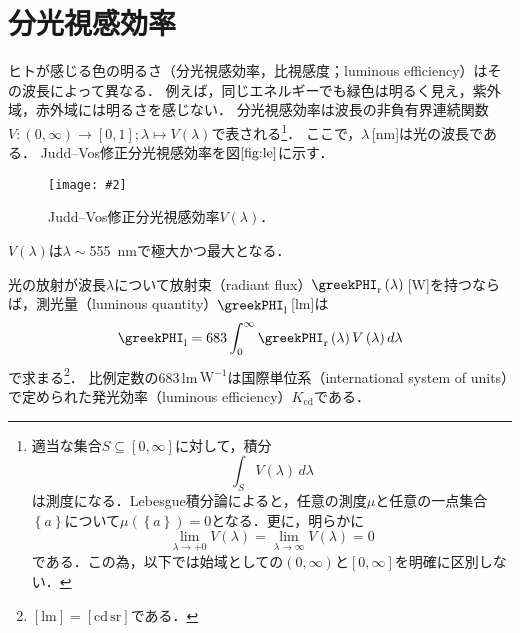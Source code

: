 \documentclass[uplatex,paper=a4,fontsize=4.0truemm,jafontsize=4.0truemm,head_space=30.0truemm,foot_space=30.0truemm,baselineskip=8.0truemm,line_length=40zw,gutter=25.0truemm,oneside,openany,fleqn,hanging_panctuation,open_bracket_pos=nibu_tentsuki,dvipdfmx,jis2004,book,titlepage]{jlreq}
\theoremstyle{mystyle}
\newcommand{\captiondot}[1]{\caption{#1．}}
\newcommand{\figureinput}[4]{\begin{figure}[tbp]\centering\texttt{[image: \#2]}\captiondot{#3}\label{fig:#4}\end{figure}}
\newcommand{\mathdisplaystyle}[1]{\(\displaystyle{#1}\)}
\newcommand{\Reference}[1]{\mathdisplaystyle{\ref{#1}}}
\newcommand{\negativevalue}[1]{{-#1}}
\newcommand{\positivevalue}[1]{{+#1}}
\newcommand{\parentheses}[1]{\left(#1\right)}
\newcommand{\braces}[1]{\left\{#1\right\}}
\newcommand{\squarebrackets}[1]{\left[#1\right]}
\begin{document}
		\section{分光視感効率}
			ヒトが感じる色の明るさ（分光視感効率，比視感度；luminous efficiency）はその波長によって異なる．
			例えば，同じエネルギーでも緑色は明るく見え，紫外域，赤外域には明るさを感じない．
			分光視感効率は波長の非負有界連続関数\mathdisplaystyle{V\colon\parentheses{0,\infty}\to\squarebrackets{0,1};\lambda\mapsto V\parentheses{\lambda}}で表される\footnote{適当な集合\mathdisplaystyle{S\subseteq\squarebrackets{0,\infty}}に対して，積分%
				\begin{equation*}
					\int_S{V\parentheses{\lambda}}\,d\lambda
				\end{equation*}
				は測度になる．Lebesgue積分論によると，任意の測度\mathdisplaystyle{\mu}と任意の一点集合\mathdisplaystyle{\braces{a}}について\mathdisplaystyle{\mu\parentheses{\braces{a}}=0}となる．更に，明らかに%
				\begin{equation*}
					\lim_{\lambda\to\positivevalue{0}}{V\parentheses{\lambda}}=\lim_{\lambda\to\infty}{V\parentheses{\lambda}}=0
				\end{equation*}
				である．この為，以下では始域としての\mathdisplaystyle{\parentheses{0,\infty}}と\mathdisplaystyle{\squarebrackets{0,\infty}}を明確に区別しない．}．
			ここで，\mathdisplaystyle{\lambda}\,[nm]は光の波長である．
			Judd--Vos修正分光視感効率\cite{Vos1978}を図\Reference{fig:le}に示す．
			\figureinput{width=\linewidth}{D:/a/figs/le.png}{Judd--Vos修正分光視感効率\mathdisplaystyle{V\parentheses{\lambda}}}{le}
			\mathdisplaystyle{V\parentheses{\lambda}}は\mathdisplaystyle{\lambda\sim{}}\SI{555}{nm}で極大かつ最大となる．

			光の放射が波長\mathdisplaystyle{\lambda}について放射束（radiant flux）\mathdisplaystyle{\greekPHI_\textrm{r}\parentheses{\lambda}}\,[W]を持つならば，測光量（luminous quantity）\mathdisplaystyle{\greekPHI_\textrm{l}}\,[lm]は
			\begin{equation*}
				\greekPHI_\textrm{l}=683\int_0^\infty{\greekPHI_\textrm{r}\parentheses{\lambda}V\parentheses{\lambda}}\,d\lambda
			\end{equation*}
			で求まる\footnote{\mathdisplaystyle{[\textrm{lm}]=[\textrm{cd}\,\textrm{sr}]}である．}．
			比例定数の683\,lm\,\mathdisplaystyle{\textrm{W}^{\negativevalue{1}}}は国際単位系（international system of units）で定められた発光効率（luminous efficiency）\mathdisplaystyle{K_\textrm{cd}}である．
\end{document}
